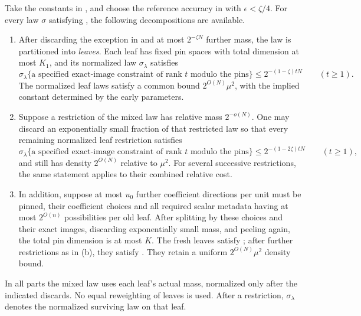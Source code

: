 \begin{lemma}\label{lem:peeling}
Take the constants in , and choose the reference accuracy in  with \(\epsilon<\zeta/4\).
For every law \(\sigma\) satisfying , the following decompositions are available.
\begin{enumerate}[label=\textup{(\alph*)}]
\item
After discarding the exception in  and at most \(2^{-\zeta N}\) further mass, the law is partitioned into \emph{leaves}.
Each leaf has fixed pin spaces with total dimension at most \(K_1\), and its normalized law \(\sigma_\lambda\) satisfies
\begin{equation}\label{eq:leaf-minentropy}
 \sigma_\lambda\{\text{a specified exact-image constraint of rank }t
                 \text{ modulo the pins}\}
 \le 2^{-(1-\zeta)tN}
 \qquad(t\ge1).
\end{equation}
The normalized leaf laws satisfy a common bound \(2^{O(N)}\mu^2\), with the implied constant determined by the early parameters.

\item
Suppose a restriction of the mixed law has relative mass \(2^{-o(N)}\).
One may discard an exponentially small fraction of that restricted law so that every remaining normalized leaf restriction satisfies
\begin{equation}\label{eq:final-leaf-minentropy}
 \sigma_\lambda\{\text{a specified exact-image constraint of rank }t
                 \text{ modulo the pins}\}
 \le 2^{-(1-2\zeta)tN}
 \qquad(t\ge1),
\end{equation}
and still has density \(2^{O(N)}\) relative to \(\mu^2\).
For several successive restrictions, the same statement applies to their combined relative cost.

\item
In addition, suppose at most \(u_0\) further coefficient directions per unit must be pinned, their coefficient choices and all required scalar metadata having at most \(2^{O(n)}\) possibilities per old leaf.
After splitting by these choices and their exact images, discarding exponentially small mass, and peeling again, the total pin dimension is at most \(K\).
The fresh leaves satisfy ; after further restrictions as in \textup{(b)}, they satisfy .
They retain a uniform \(2^{O(N)}\mu^2\) density bound.
\end{enumerate}
In all parts the mixed law uses each leaf's actual mass, normalized only after the indicated discards.
No equal reweighting of leaves is used.
After a restriction, \(\sigma_\lambda\) denotes the normalized surviving
law on that leaf.
\end{lemma}

